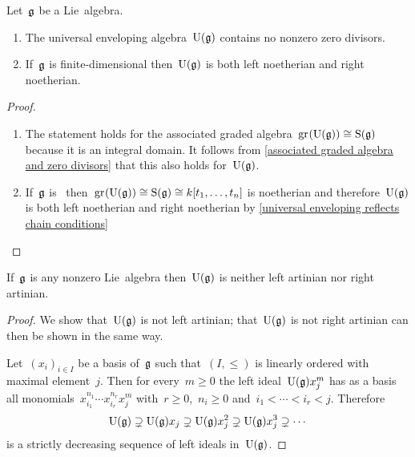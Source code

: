 \begin{corollary}
  \label{uea contains no zero divisors}
  Let~$\mathfrak{g}$ be a Lie~algebra.
  \begin{enumerate}
    \item
      The universal enveloping algebra~$\operatorname{U}(\mathfrak{g})$ contains no nonzero zero divisors.
    \item
      If~$\mathfrak{g}$ is finite-dimensional then~$\operatorname{U}(\mathfrak{g})$ is both left noetherian and right noetherian.
  \end{enumerate}
\end{corollary}


\begin{proof}
  \leavevmode
  \begin{enumerate}
    \item
      The statement holds for the associated graded algebra~$\gr(\Univ(\glie)) \cong \Symm(\glie)$ because it is an integral domain.
      It follows from \cref{associated graded algebra and zero divisors} that this also holds for~$\operatorname{U}(\mathfrak{g})$.
    \item
      If~$\mathfrak{g}$ is~{} then~$\gr(\Univ(\glie)) \cong \Symm(\glie) \cong k[t_1, \dotsc, t_n]$ is noetherian and therefore~$\operatorname{U}(\mathfrak{g})$ is both left noetherian and right noetherian by \cref{universal enveloping reflects chain conditions}
    \qedhere
  \end{enumerate}
\end{proof}


\begin{lemma}
  If~$\mathfrak{g}$ is any nonzero Lie~algebra then~$\operatorname{U}(\mathfrak{g})$ is neither left artinian nor right artinian.
\end{lemma}


\begin{proof}
  We show that~$\operatorname{U}(\mathfrak{g})$ is not left artinian;
  that~$\operatorname{U}(\mathfrak{g})$ is not right artinian can then be shown in the same way.
  
  Let~$(x_i)_{i \in I}$ be a basis of~$\mathfrak{g}$ such that~$(I, \leq)$ is linearly ordered with maximal element~$j$.
  Then for every~$m \geq 0$ the left ideal~$\operatorname{U}(\mathfrak{g}) x_j^m$ has as a basis all monomials~$x_{i_1}^{n_1} \dotsm x_{i_r}^{n_r} x_j^m$ with~$r \geq 0$,~$n_i \geq 0$ and~$i_1 < \dotsb < i_r < j$.
  Therefore
  \[
    \operatorname{U}(\mathfrak{g})
    \supsetneq
    \operatorname{U}(\mathfrak{g}) x_j
    \supsetneq
    \operatorname{U}(\mathfrak{g}) x_j^2
    \supsetneq
    \operatorname{U}(\mathfrak{g}) x_j^3
    \supsetneq
    \dotsb
  \]
  is a strictly decreasing sequence of left ideals in~$\operatorname{U}(\mathfrak{g})$.
\end{proof}


